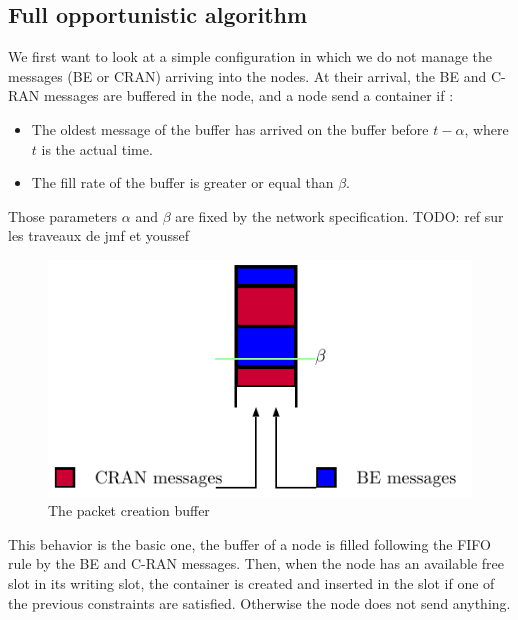\documentclass[a4paper,10pt,french,english]{article}
\newcommand{\todo}[1]{{\color{red} TODO: {#1}}}
\begin{document}
    \subsection{Full opportunistic algorithm}
    \label{sec:fullopport}
    We first want to look at a simple configuration in which we do not manage the messages (BE or CRAN) arriving into the nodes. At their arrival, the BE and C-RAN messages are buffered in the node, and a node send a container if : 
     \begin{itemize}
    \item The oldest message of the buffer has arrived on the buffer before $t - \alpha$, where $t$ is the actual time.
    \item The fill rate of the buffer is greater or equal than $\beta$.
    \end{itemize}
    Those parameters $\alpha$ and $\beta$ are fixed by the network specification.\todo{ref sur les traveaux de jmf et youssef}

    \begin{figure}[h!]
        \begin{center}
      \includegraphics[scale=0.5]{insertionbuff.pdf}

      \caption{The packet creation buffer}
      \end{center}
  \end{figure}

This behavior is the basic one, the buffer of a node is filled following the FIFO rule by the BE and C-RAN messages. Then, when the node has an available free slot in its writing slot, the container is created and inserted in the slot if one of the previous constraints are satisfied. Otherwise the node does not send anything.
\end{document}
